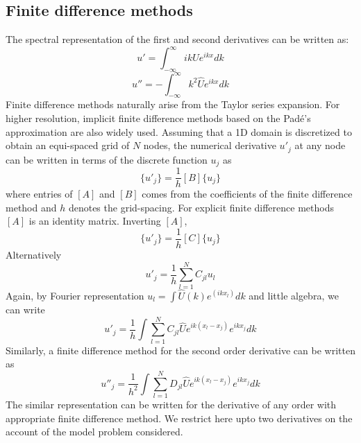 \documentclass[fleqn]{article}
\begin{document}
\subsection{Finite difference methods}
The spectral representation of the first and second derivatives can be written as:
\begin{equation*}
u' = \int_{-\infty}^{\infty} i k \hat{U} e^{i k x} dk
\end{equation*} 
\begin{equation*}
u'' = - \int_{-\infty}^{\infty} k^2 \hat{U} e^{i k x} dk
\end{equation*}
Finite difference methods naturally arise from the Taylor series expansion. For higher resolution, implicit finite difference methods based on the Pad\'e's approximation are also widely used. Assuming that a 1D domain is discretized to obtain an equi-spaced grid of $N$ nodes, the numerical derivative $u'_j$ at any node can be written in terms of the discrete function $u_j$ as
\begin{equation*}
[A] \{u'_j\} = \frac{1}{h} [B]\{u_j\}
\end{equation*}
where entries of $[A]$ and $[B]$ comes from the coefficients of the finite difference method and $h$ denotes the grid-spacing. For explicit finite difference methods $[A]$ is an identity matrix. Inverting $[A]$,
\begin{equation*}
\{u'_j\} = \frac{1}{h} [C] \{u_j\}
\end{equation*} 
Alternatively
\begin{equation*}
u'_j = \frac{1}{h} \sum_{l=1}^{N} C_{jl} u_l 
\end{equation*} 
Again, by Fourier representation $u_l = \int \hat{U}(k) e^{(i k x_l)} dk$ and little algebra, we can write
\begin{equation}
u'_j = \frac{1}{h} \int \sum_{l=1}^{N} C_{jl} \hat{U} e^{ik(x_l - x_j)} e^{i k x_j} dk 
\label{1st_der}
\end{equation} 
Similarly, a finite difference method for the second order derivative can be written as
\begin{equation}
u''_j = \frac{1}{h^2} \int \sum_{l=1}^{N} D_{jl} \hat{U} e^{ik(x_l - x_j)} e^{i k x_j} dk 
\label{2nd_der}
\end{equation}
The similar representation can be written for the derivative of any order with appropriate finite difference method. We restrict here upto two derivatives on the account of the model problem considered.
\end{document}
